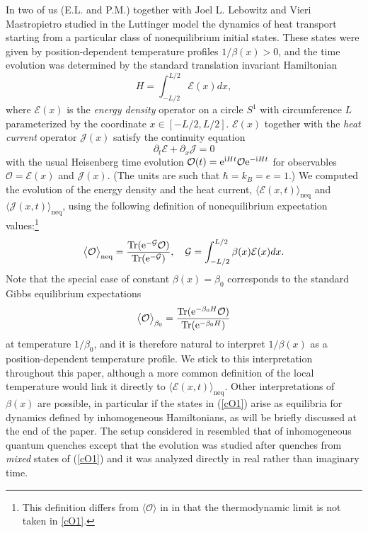 \documentclass[12pt,a4paper]{article}
\newcommand{\SL}{S^1}
\newcommand{\ee}{{\rm e}}
\newcommand{\ii}{{\rm i}}
\newcommand{\cE}{\mathcal{E}}
\newcommand{\cG}{\mathcal{G}}
\newcommand{\cJ}{\mathcal{J}}
\newcommand{\cO}{\mathcal{O}}
\def\Tr{\operatorname{Tr}}
\theoremstyle{definition}
\theoremstyle{remark}
\begin{document}
In \cite{LLMM2} two of us (E.L. and P.M.) together with Joel L.
Lebowitz and Vieri Mastropietro studied in the Luttinger model the dynamics of heat transport starting from a particular class of nonequilibrium initial states. These states were given by position-dependent temperature profiles $1/\beta(x) > 0$, and the time evolution was determined by the standard
translation invariant Hamiltonian 
%
\begin{equation} 
\label{H} 
H = \int_{-L/2}^{L/2}\cE(x)dx,
\end{equation} 
where $\cE(x)$ is the {\it energy density} operator  
on a circle $\SL$ with circumference $L$ parameterized by the coordinate 
$x \in [-L/2, L/2]$. $\cE(x)$ together with the 
{\it heat current} operator $\cJ(x)$ satisfy the  continuity equation
%
\begin{equation} 
\partial_t\cE + \partial_x\cJ = 0
\end{equation}
% 
with the usual Heisenberg time evolution $\cO(t) = \ee^{\ii Ht}\cO\ee^{-\ii Ht}$ for observables $\cO = \cE(x)$ and $\cJ(x)$.
(The units are such that $\hbar = k_B = e = 1$.)
We computed the evolution of the energy density and the heat current, $\langle\cE(x,t)\rangle_{\text{neq}}$ and $\langle\cJ(x,t)\rangle_{\text{neq}}$, using the following definition of nonequilibrium expectation values:\footnote{This definition differs from $\langle \cO \rangle$ in \cite{LLMM2} in that the thermodynamic limit is not taken in \eqref{cO1}.}
%
\begin{equation} 
\label{cO1} 
\big\langle\cO\big\rangle_{\text{neq}}
= \frac{\Tr(\ee^{-\cG}\cO)}{\Tr(\ee^{-\cG})}, 
\quad
\cG = \int_{-L/2}^{L/2}\beta(x)\cE(x) dx. 
\end{equation} 
%
Note that the special case of constant $\beta(x)=\beta_0$ corresponds to the standard Gibbs equilibrium expectations
%
\begin{equation} 
\label{Gibbs}
\big\langle\cO\big\rangle_{\beta_0}
=  \frac{\Tr(\ee^{-\beta_0H}\cO)}{\Tr(\ee^{-\beta_0H})} 
\end{equation}
%
at temperature $1/\beta_0$, and it is therefore natural to interpret $1/\beta(x)$ as a position-dependent temperature profile. We stick to this
interpretation throughout this paper, although a more common definition of
the local temperature would link it directly to
$\langle\cE(x,t)\rangle_{\text{neq}}$. Other
interpretations of $\beta(x)$ are possible, in particular if the states
in (\ref{cO1}) arise as equilibria for dynamics defined by inhomogeneous
Hamiltonians, as will be briefly discussed at the end of the paper.
The setup considered in \cite{LLMM2} resembled that of inhomogeneous 
quantum quenches \cite{SoCa} except that the evolution was studied after
quenches from {\it mixed} states of (\ref{cO1}) and it was analyzed directly
in real rather than imaginary time.
\end{document}
